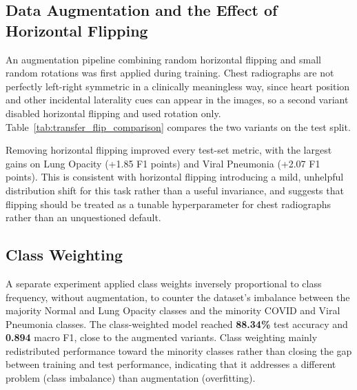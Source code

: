 \subsection{Data Augmentation and the Effect of Horizontal Flipping}
\label{subsec:transfer_augmentation}

An augmentation pipeline combining random horizontal flipping and small
random rotations was first applied during training. Chest radiographs are
not perfectly left-right symmetric in a clinically meaningless way, since
heart position and other incidental laterality cues can appear in the
images, so a second variant disabled horizontal flipping and used rotation
only. Table~\ref{tab:transfer_flip_comparison} compares the two variants on
the test split.

\begin{table}[H]
\centering
\caption{Effect of horizontal flipping on the augmented transfer model (test split).}
\label{tab:transfer_flip_comparison}
\end{table}

Removing horizontal flipping improved every test-set metric, with the
largest gains on Lung Opacity (+1.85 F1 points) and Viral Pneumonia (+2.07
F1 points). This is consistent with horizontal flipping introducing a mild,
unhelpful distribution shift for this task rather than a useful invariance,
and suggests that flipping should be treated as a tunable hyperparameter
for chest radiographs rather than an unquestioned default.

\subsection{Class Weighting}
\label{subsec:transfer_class_weighting}

A separate experiment applied class weights inversely proportional to class
frequency, without augmentation, to counter the dataset's imbalance between
the majority Normal and Lung Opacity classes and the minority COVID and
Viral Pneumonia classes. The class-weighted model reached \textbf{88.34\%}
test accuracy and \textbf{0.894} macro F1, close to the augmented
variants. Class weighting mainly redistributed performance toward the
minority classes rather than closing the gap between training and test
performance, indicating that it addresses a different problem (class
imbalance) than augmentation (overfitting).

